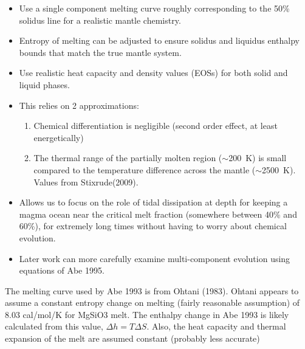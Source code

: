 \begin{itemize}
  \item Use a single component melting curve roughly corresponding to the 50\% solidus line for a realistic mantle chemistry. 
  \item Entropy of melting can be adjusted to ensure solidus and liquidus enthalpy bounds that match the true mantle system. 
  \item Use realistic heat capacity and density values (EOSs) for both solid and liquid phases. 
  \item This relies on 2 approximations: 
    \begin{enumerate}
      \item Chemical differentiation is negligible (second order effect, at least energetically)
      \item The thermal range of the partially molten region ($\sim$200~K) is small compared to the temperature difference across the mantle ($\sim$2500~K). Values from Stixrude(2009).
    \end{enumerate}
  \item Allows us to focus on the role of tidal dissipation at depth for keeping a magma ocean near the critical melt fraction (somewhere between 40\% and 60\%), for extremely long times without having to worry about chemical evolution. 
  \item Later work can more carefully examine multi-component evolution using equations of Abe 1995.
\end{itemize}

The melting curve used by Abe 1993 is from Ohtani (1983). 
Ohtani appears to assume a constant entropy change on melting (fairly reasonable assumption) of 8.03 cal/mol/K for MgSiO3 melt.
The enthalpy change in Abe 1993 is likely calculated from this value, $\Delta h = T \Delta S$.
Also, the heat capacity and thermal expansion of the melt are assumed constant (probably less accurate)


